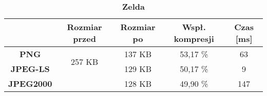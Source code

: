 \begin{table}[!h]
	\centering
	\caption{\textbf{Zelda}}
	\label{my-label}
	\begin{tabular}{|c|c|c|c|c|}                                             
		\hline
		& \textbf{Rozmiar przed} & \textbf{Rozmiar po} & \textbf{Wspł. kompresji} & \textbf{Czas {[}ms{]}} \\ \hline 
		\textbf{PNG}      &          \multicolumn{1}{c|}{\multirow{2}{*}{257 KB}}             &      137 KB               &     53,17 \%                    &          63                   \\\cline{3-5}
		\textbf{JPEG-LS}  &                        &      129 KB               &       50,17 \%                  &         9                 \\\cline{3-5}
		\textbf{JPEG2000} &                        &      128 KB               &       49,90 \%                  &        147              \\ \hline
	\end{tabular}
\end{table}
